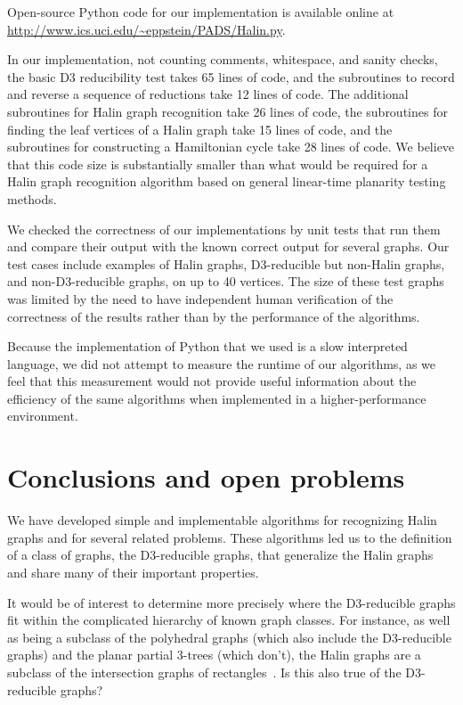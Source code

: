 \documentclass{article}
\begin{document}
Open-source Python code for our implementation is available online at
\url{http://www.ics.uci.edu/~eppstein/PADS/Halin.py}.

In our implementation, not counting comments, whitespace, and sanity checks, the basic D3 reducibility test takes 65 lines of code, and the subroutines to record and reverse a sequence of reductions take 12 lines of code. The additional subroutines for Halin graph recognition take 26 lines of code, the subroutines for finding the leaf vertices of a Halin graph take 15 lines of code, and the subroutines for constructing a Hamiltonian cycle take 28 lines of code. We believe that this code size is substantially smaller than what would be required for a Halin graph recognition algorithm based on general linear-time planarity testing methods.

We checked the correctness of our implementations by unit tests that run them and compare their output with the known correct output for several graphs. Our test cases include examples of Halin graphs, D3-reducible but non-Halin graphs, and non-D3-reducible graphs, on up to 40 vertices. The size of these test graphs was limited by the need to have independent human verification of the correctness of the results rather than by the performance of the algorithms.

Because the implementation of Python that we used is a slow interpreted language, we did not attempt to measure the runtime of our algorithms, as we feel that this measurement would not provide useful information about the efficiency of the same algorithms when implemented in a higher-performance environment.

\section{Conclusions and open problems}

We have developed simple and implementable algorithms for recognizing Halin graphs and for several related problems. These algorithms led us to the definition of a class of graphs, the D3-reducible graphs, that generalize the Halin graphs and share many of their important properties.

It would be of interest to determine more precisely where the D3-reducible graphs fit within the complicated hierarchy of known graph classes. For instance, as well as being a subclass of the polyhedral graphs (which also include the D3-reducible graphs) and the planar partial 3-trees (which don't), the Halin graphs are a subclass of the intersection graphs of rectangles~\cite{ChaFraSur-DM-09}. Is this also true of the  D3-reducible graphs?



\end{document}
